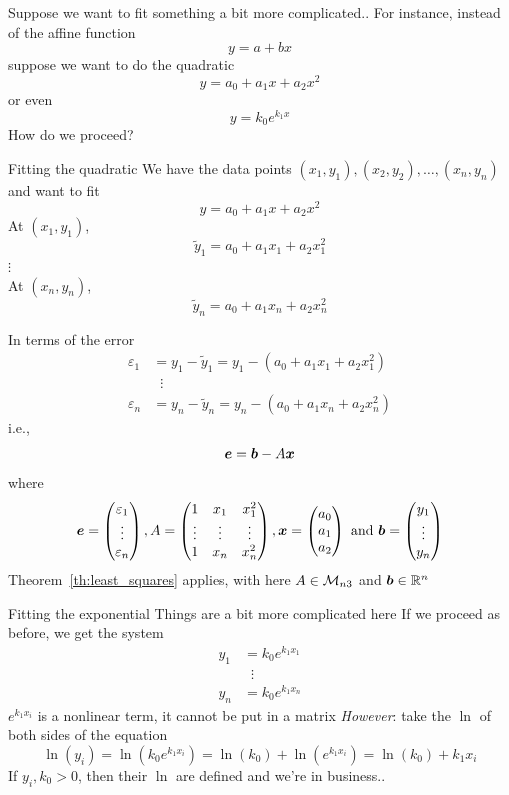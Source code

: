 \documentclass[aspectratio=169]{beamer}\usepackage[]{graphicx}\usepackage[]{xcolor}
\begin{document}

\begin{frame}{Suppose we want to fit something a bit more complicated..}
For instance, instead of the affine function
\[
y = a+bx
\]
suppose we want to do the quadratic
\[
y = a_0+a_1x+a_2x^2
\]
or even
\[
y = k_0 e^{k_1x}
\]
\vfill
How do we proceed?
\end{frame}


\begin{frame}{Fitting the quadratic}
We have the data points $(x_1,y_1),(x_2,y_2),\ldots,(x_n,y_n)$ and want to fit
\[
y = a_0+a_1x+a_2x^2
\]
At $(x_1,y_1)$,
\[
\tilde y_1 = a_0+a_1x_1+a_2x_1^2
\]
$\vdots$\\
At $(x_n,y_n)$,
\[
\tilde y_n = a_0+a_1x_n+a_2x_n^2
\]
\end{frame}

\begin{frame}
In terms of the error
\begin{align*}
\varepsilon_1 &= y_1-\tilde y_1 = y_1-(a_0+a_1x_1+a_2x_1^2) \\
&\;\;\vdots\\
\varepsilon_n &= y_n-\tilde y_n = y_n-(a_0+a_1x_n+a_2x_n^2)
\end{align*}
i.e.,
\[
\bm{e} = \bm{b}-A\bm{x} 
\]
where
\[
\bm{e} = \begin{pmatrix}
\varepsilon_1\\ \vdots\\ \varepsilon_n
\end{pmatrix},
A=\begin{pmatrix}
1 & x_1 & x_1^2\\ \vdots & \vdots & \vdots \\ 1 & x_n & x_n^2
\end{pmatrix},
\bm{x} = \begin{pmatrix}
a_0\\a_1\\a_2
\end{pmatrix}\textrm{ and }
\bm{b} = \begin{pmatrix}
y_1\\ \vdots\\ y_n
\end{pmatrix}
\]
\vfill
Theorem~\ref{th:least_squares} applies, with here $A\in\mathcal{M}_{n3}$ and $\bm{b}\in\mathbb{R}^n$
\end{frame}


\begin{frame}{Fitting the exponential}
Things are a bit more complicated here
\vfill
If we proceed as before, we get the system
\begin{align*}
y_1 &= k_0 e^{k_1x_1} \\
&\;\;\vdots \\
y_n &= k_0 e^{k_1x_n}
\end{align*}
$e^{k_1x_i}$ is a nonlinear term, it cannot be put in a matrix
\vfill
\emph{However}: take the $\ln$ of both sides of the equation
\[
\ln(y_i) = \ln(k_0e^{k_1x_i}) = \ln(k_0)+\ln(e^{k_1x_i}) = \ln(k_0)+k_1x_i
\]
If $y_i,k_0>0$, then their $\ln$ are defined and we're in business..
\end{frame}
\end{document}
